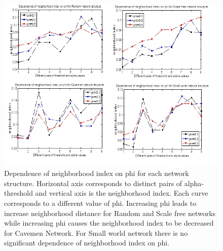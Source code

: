 \documentclass{beamer}
\begin{document}
\begin{frame}
\begin{figure}
[htp]
\begin{center}
\includegraphics{Fig6}
\end{center}
\caption{Dependence of neighborhood index on phi for each network structure. Horizontal axis corresponds to distinct pairs of alpha-threshold and   vertical axis is the neighborhood index. Each curve corresponds to a different value of phi. Increasing phi leads to increase neighborhood distance for Random and Scale free networks while increasing phi causes the neighborhood index to be decreased for Cavemen Network. For Small world network there is no significant dependence of neighborhood index on phi.}
\label {fig6}
\end{figure}
\end{frame}
%
\end{document}
